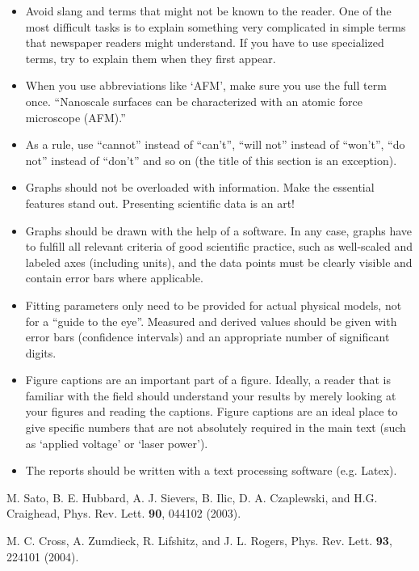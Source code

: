\documentclass[12pt,a4paper]{article}
\begin{document}
\begin{itemize}
\item Avoid slang and terms that might not be known to the reader. One of the most difficult tasks is to explain something very complicated in simple terms that newspaper readers might understand. If you have to use specialized terms, try to explain them when they first appear.

\item When you use abbreviations like `AFM', make sure you use the full term once. ``Nanoscale surfaces can be characterized with an atomic force microscope (AFM).''

\item As a rule, use ``cannot'' instead of ``can't'',  ``will not'' instead of ``won't'', ``do not'' instead of ``don't'' and so on (the title of this section is an exception).

\item Graphs should not be overloaded with information. Make the essential features stand out. Presenting scientific data is an art!

\item Graphs should be drawn with the help of a software. In any case, graphs have to fulfill all relevant criteria of good scientific practice, such as well-scaled and labeled axes (including units), and the data points must be clearly
visible and contain error bars where applicable.

\item Fitting parameters only need to be provided for actual physical models, not for a ``guide to the eye''. Measured and derived values should be given with error bars (confidence intervals) and an appropriate number of significant digits.

\item Figure captions are an important part of a figure. Ideally, a reader that is familiar with the field should understand your results by merely looking at your figures and reading the captions. Figure captions are an ideal place to give specific numbers that are not absolutely required in the main text (such as `applied voltage' or `laser power').

\item The reports should be written with a text processing software (e.g. Latex).

\end{itemize}


\begin{thebibliography}{99}


M. Sato, B. E. Hubbard, A. J. Sievers, B. Ilic, D. A. Czaplewski, and H.G. Craighead, Phys. Rev. Lett. \textbf{90}, 044102 (2003).


M. C. Cross, A. Zumdieck, R. Lifshitz, and J. L. Rogers, Phys. Rev. Lett. \textbf{93}, 224101 (2004).


\end{thebibliography}
\end{document}
